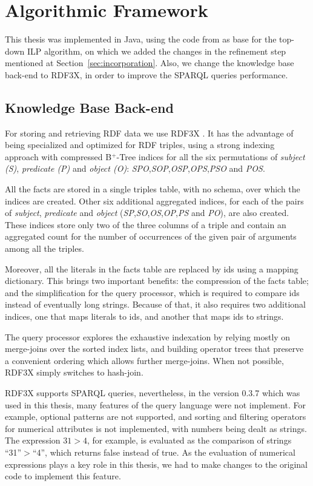 \section{Algorithmic Framework}
\label{af:intro}

This thesis was implemented in Java, using the code from \citet{Teflioudi2011} as base for the top-down ILP
algorithm, on which we added the changes in the refinement step mentioned at Section~\ref{sec:incorporation}. Also, we
change the knowledge base back-end to RDF3X, in order to improve the SPARQL queries performance.

\subsection{Knowledge Base Back-end}

For storing and retrieving RDF data we use RDF3X \citep{Neumann:2010:RES:1731351.1731354}. It has the advantage of being
specialized and optimized for RDF triples, using a strong indexing approach with compressed B$^+$-Tree indices for all
the six permutations of \emph{subject (S)}, \emph{predicate (P)} and \emph{object (O)}:
\emph{SPO},\emph{SOP},\emph{OSP},\emph{OPS},\emph{PSO} and \emph{POS}.

All the facts are stored in a single triples table, with no schema, over which the indices are created. Other six
additional aggregated indices, for each of the pairs of \emph{subject}, \emph{predicate} and \emph{object}
(\emph{SP},\emph{SO},\emph{OS},\emph{OP},\emph{PS} and \emph{PO}), are also created. These indices store only two of the
three columns of a triple and contain an aggregated count for the number of occurrences of the given pair of arguments
among all the triples.

Moreover, all the literals in the facts table are replaced by ids using a mapping dictionary. This brings two important
benefits: the compression of the facts table; and the simplification for the query processor, which is required to
compare ids instead of eventually long strings. Because of that, it also requires two additional indices, one that maps
literals to ids, and another that maps ids to strings.

The query processor explores the exhaustive indexation by relying mostly on merge-joins over the sorted index lists, and
building operator trees that preserve a convenient ordering which allows further merge-joins. When not possible,
RDF3X simply switches to hash-join.

RDF3X supports SPARQL queries, nevertheless, in the version 0.3.7 which was used in this thesis, many features of the
query language were not implement. For example, optional patterns are not supported, and sorting and filtering
operators for numerical attributes is not implemented, with numbers being dealt as strings. The expression $31>4$,
for example, is evaluated as the comparison of strings ``31''$>$``4'', which returns false instead of true. As the
evaluation of numerical expressions plays a key role in this thesis, we had to make changes to the original code
to implement this feature.


